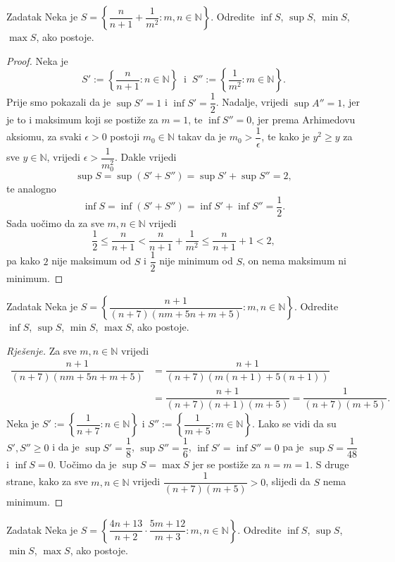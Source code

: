 \begin{exercise}{Zadatak}
Neka je \(S=\left\{\dfrac{n}{n+1}+\dfrac{1}{m^2} : m, n\in \mathbb{N}\right\}\). Odredite $\inf{S}$, $\sup{S}$, $\min{S}$, $\max{S}$, ako postoje.
\end{exercise}
\begin{proof}
Neka je \[S':=\left\{\dfrac{n}{n+1} : n\in \mathbb{N}\right\}\;\;\text{i}\;\;S'':=\left\{\dfrac{1}{m^2} : m\in \mathbb{N}\right\}.\] Prije smo pokazali da je \(\sup{S'}=1\) i \(\inf{S'}=\dfrac{1}{2}\). Nadalje, vrijedi \(\sup{A''}=1\), jer je to i maksimum koji se postiže za \(m=1\), te \(\inf{S''}=0\), jer prema Arhimedovu aksiomu, za svaki \(\epsilon>0\) postoji \(m_0\in \mathbb{N}\) takav da je \(m_0>\dfrac{1}{\epsilon}\), te kako je \(y^2\geq y\) za sve \(y\in \mathbb{N}\), vrijedi \(\epsilon>\dfrac{1}{m_0^2}\). Dakle vrijedi 
\[\sup{S}=\sup{(S'+S'')}=\sup{S'}+\sup{S''}=2,\] 
te analogno \[
\inf{S}=\inf{(S'+S'')}=\inf{S'}+\inf{S''}=\dfrac{1}{2}.
\]
Sada uočimo da za sve $m, n\in \mathbb{N}$ vrijedi
$$\dfrac{1}{2}\leq \dfrac{n}{n+1}<\dfrac{n}{n+1}+\dfrac{1}{m^2}\leq \dfrac{n}{n+1}+1<2,$$
pa kako $2$ nije maksimum od $S$ i $\dfrac{1}{2}$ nije minimum od $S$, on nema maksimum ni minimum.
\end{proof}
\begin{exercise}{Zadatak}
Neka je \(S=\left\{\dfrac{n+1}{(n+7)(nm+5n+m+5)} : m, n\in \mathbb{N}\right\}\). Odredite \(\inf{S}\), \(\sup{S}\), \(\min{S}\), \(\max{S}\), ako postoje.
\end{exercise}
\begin{proof}[Rješenje]
Za sve \(m, n\in \mathbb{N}\) vrijedi
\begin{align*}
\dfrac{n+1}{(n+7)(nm+5n+m+5)}&=\dfrac{n+1}{(n+7)(m(n+1)+5(n+1))}\\
&=\dfrac{n+1}{(n+7)(n+1)(m+5)}=\dfrac{1}{(n+7)(m+5)}.
\end{align*}
Neka je \(S':=\left\{\dfrac{1}{n+7} : n\in \mathbb{N}\right\}\) i \(S'':=\left\{\dfrac{1}{m+5} : m\in \mathbb{N}\right\}\). Lako se vidi da su \(S', S''\geq 0\) i da je \(\sup{S'}=\dfrac{1}{8}\), \(\sup{S''}=\dfrac{1}{6}\), $\inf{S'}=\inf{S''}=0$ pa je \(\sup{S}=\dfrac{1}{48}\) i $\inf{S}=0$. Uočimo da je $\sup{S}=\max{S}$ jer se postiže za $n=m=1$. S druge strane, kako za sve $m, n\in \mathbb{N}$ vrijedi $\dfrac{1}{(n+7)(m+5)}>0$, slijedi da $S$ nema minimum.
\end{proof}
\begin{exercise}{Zadatak}
Neka je \(S=\left\{\dfrac{4n+13}{n+2}\cdot \dfrac{5m+12}{m+3} : m, n\in \mathbb{N}\right\}\). Odredite \(\inf{S}\), \(\sup{S}\), \(\min{S}\), \(\max{S}\), ako postoje.
\end{exercise}

